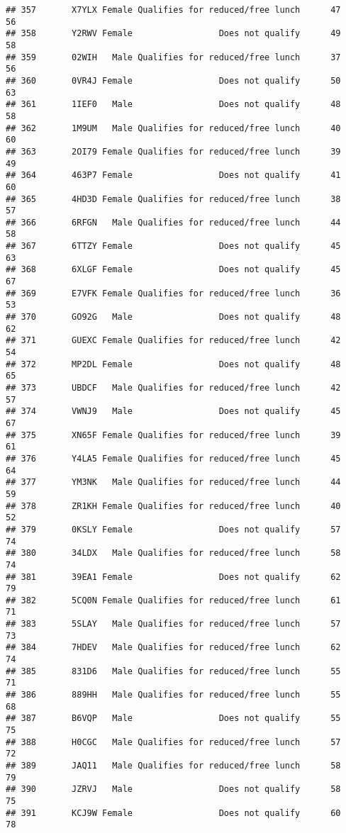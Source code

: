 \documentclass[
]{article}
\begin{document}
\begin{verbatim}
## 357       X7YLX Female Qualifies for reduced/free lunch      47       56
## 358       Y2RWV Female                 Does not qualify      49       58
## 359       02WIH   Male Qualifies for reduced/free lunch      37       56
## 360       0VR4J Female                 Does not qualify      50       63
## 361       1IEF0   Male                 Does not qualify      48       58
## 362       1M9UM   Male Qualifies for reduced/free lunch      40       60
## 363       2OI79 Female Qualifies for reduced/free lunch      39       49
## 364       463P7 Female                 Does not qualify      41       60
## 365       4HD3D Female Qualifies for reduced/free lunch      38       57
## 366       6RFGN   Male Qualifies for reduced/free lunch      44       58
## 367       6TTZY Female                 Does not qualify      45       63
## 368       6XLGF Female                 Does not qualify      45       67
## 369       E7VFK Female Qualifies for reduced/free lunch      36       53
## 370       GO92G   Male                 Does not qualify      48       62
## 371       GUEXC Female Qualifies for reduced/free lunch      42       54
## 372       MP2DL Female                 Does not qualify      48       65
## 373       UBDCF   Male Qualifies for reduced/free lunch      42       57
## 374       VWNJ9   Male                 Does not qualify      45       67
## 375       XN65F Female Qualifies for reduced/free lunch      39       61
## 376       Y4LA5 Female Qualifies for reduced/free lunch      45       64
## 377       YM3NK   Male Qualifies for reduced/free lunch      44       59
## 378       ZR1KH Female Qualifies for reduced/free lunch      40       52
## 379       0KSLY Female                 Does not qualify      57       74
## 380       34LDX   Male Qualifies for reduced/free lunch      58       74
## 381       39EA1 Female                 Does not qualify      62       79
## 382       5CQ0N Female Qualifies for reduced/free lunch      61       71
## 383       5SLAY   Male Qualifies for reduced/free lunch      57       73
## 384       7HDEV   Male Qualifies for reduced/free lunch      62       74
## 385       831D6   Male Qualifies for reduced/free lunch      55       71
## 386       889HH   Male Qualifies for reduced/free lunch      55       68
## 387       B6VQP   Male                 Does not qualify      55       75
## 388       H0CGC   Male Qualifies for reduced/free lunch      57       72
## 389       JAQ11   Male Qualifies for reduced/free lunch      58       79
## 390       JZRVJ   Male                 Does not qualify      58       75
## 391       KCJ9W Female                 Does not qualify      60       78

\end{verbatim}
\end{document}
